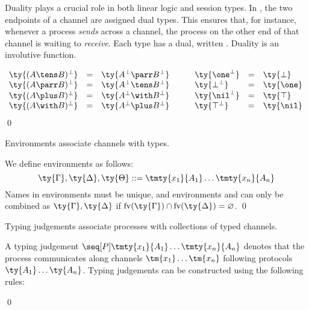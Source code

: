 \documentclass[UKenglish]{llncs}
\begin{document}
Duality plays a crucial role in both linear logic and session types.
In \cp, the two endpoints of a channel are assigned dual types.
This ensures that, for instance, whenever a process \emph{sends} across a
channel, the process on the other end of that channel is waiting to
\emph{receive}.
Each type  has a dual, written .
Duality is an involutive function.
\begin{definition}[Duality]\label{def:cp-negation}
  \[\!
    \begin{array}{lclclcl}
              \ty{(A \tens B)^\bot} &=& \ty{A^\bot \parr B^\bot}
      &\quad& \ty{\one^\bot}        &=& \ty{\bot}
      \\      \ty{(A \parr B)^\bot} &=& \ty{A^\bot \tens B^\bot}
      &\quad& \ty{\bot^\bot}        &=& \ty{\one}
      \\      \ty{(A \plus B)^\bot} &=& \ty{A^\bot \with B^\bot}
      &\quad& \ty{\nil^\bot}        &=& \ty{\top}
      \\      \ty{(A \with B)^\bot} &=& \ty{A^\bot \plus B^\bot}
      &\quad& \ty{\top^\bot}        &=& \ty{\nil}
    \end{array}
  \]
  \qed
\end{definition}
Environments associate channels with types.
\begin{definition}[Environments]\label{def:cp-environments}
  We define environments as follows:
  \[
    \ty{\Gamma}, \ty{\Delta}, \ty{\Theta}
    ::= \tmty{x_1}{A_1}\dots\tmty{x_n}{A_n}
  \] 
  Names in environments must be unique, and environments \ty{\Gamma} and
  \ty{\Delta} can only be combined as $\ty{\Gamma}, \ty{\Delta}$ if
  $\text{fv}(\ty{\Gamma}) \cap \text{fv}(\ty{\Delta}) = \varnothing$. 
  \qed
\end{definition}
Typing judgements associate processes with collections of typed channels.
\begin{definition}\label{def:cp-typing-judgement}
  A typing judgement $\seq[{ P }]{\tmty{x_1}{A_1}\dots\tmty{x_n}{A_n}}$ denotes
  that the process  communicates along channels $\tm{x_1}\dots\tm{x_n}$
  following protocols $\ty{A_1}\dots\ty{A_n}$.
  Typing judgements can be constructed using the following rules:
  {\normalfont
    \begin{center} \cpInfAx    \cpInfCut   \end{center}
    \begin{center} \cpInfTens  \cpInfParr  \end{center}
    \begin{center} \cpInfOne   \cpInfBot   \end{center}
    \begin{center}   \end{center}
    \begin{center} \cpInfWith              \end{center}
    \begin{center} \cpInfNil   \cpInfTop   \end{center}
  }
  \qed
\end{definition}
\end{document}
